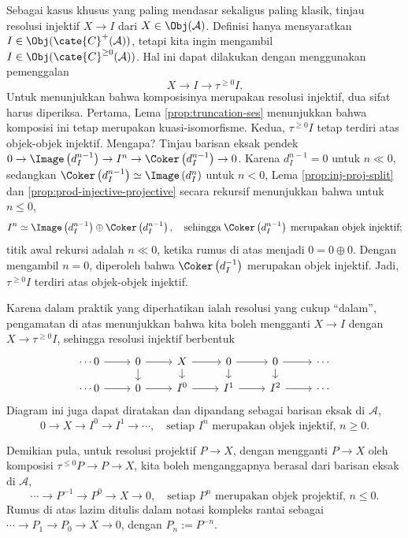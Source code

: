 \begin{contoh}\label{eg:resolution-single}
	Sebagai kasus khusus yang paling mendasar sekaligus paling klasik, tinjau resolusi injektif $X \to I$ dari $X \in \Obj(\mathcal{A})$. Definisi hanya mensyaratkan $I \in \Obj(\cate{C}^+(\mathcal{A}))$, tetapi kita ingin mengambil $I \in \Obj(\cate{C}^{\geq 0}(\mathcal{A}))$. Hal ini dapat dilakukan dengan menggunakan pemenggalan
	\[ X \to I \to \tau^{\geq 0} I . \]
	Untuk menunjukkan bahwa komposisinya merupakan resolusi injektif, dua sifat harus diperiksa. Pertama, Lema \ref{prop:truncation-ses} menunjukkan bahwa komposisi ini tetap merupakan kuasi-isomorfisme. Kedua, $\tau^{\geq 0} I$ tetap terdiri atas objek-objek injektif. Mengapa? Tinjau barisan eksak pendek $0 \to \Image\left(d_I^{n-1} \right) \to I^n \to \Coker\left( d_I^{n-1} \right) \to 0$. Karena $d_I^{n-1} = 0$ untuk $n \ll 0$, sedangkan $\Coker\left( d_I^{n-1} \right) \simeq \Image\left( d_I^n \right)$ untuk $n < 0$, Lema \ref{prop:inj-proj-split} dan \ref{prop:prod-injective-projective} secara rekursif menunjukkan bahwa untuk $n \leq 0$,
	\[ I^n \simeq \Image\left(d_I^{n-1} \right) \oplus \Coker\left( d_I^{n-1} \right) , \quad \text{sehingga}\; \Coker\left(d_I^{n-1} \right) \;\text{merupakan objek injektif}; \]
	titik awal rekursi adalah $n \ll 0$, ketika rumus di atas menjadi $0 = 0 \oplus 0$. Dengan mengambil $n=0$, diperoleh bahwa $\Coker\left( d_I^{-1}\right)$ merupakan objek injektif. Jadi, $\tau^{\geq 0} I$ terdiri atas objek-objek injektif.

	Karena dalam praktik yang diperhatikan ialah resolusi yang cukup ``dalam'', pengamatan di atas menunjukkan bahwa kita boleh mengganti $X \to I$ dengan $X \to \tau^{\geq 0} I$, sehingga resolusi injektif berbentuk
	\[\begin{tikzcd}[row sep=small]
		\cdots 0 \arrow[r] & 0 \arrow[r] \arrow[d] & X \arrow[d] \arrow[r] & 0 \arrow[r] \arrow[d] & 0 \arrow[r] \arrow[d] & \cdots \\
		\cdots 0 \arrow[r] & 0 \arrow[r] & I^0 \arrow[r] & I^1 \arrow[r] & I^2 \arrow[r] & \cdots
	\end{tikzcd}\]
	Diagram ini juga dapat diratakan dan dipandang sebagai barisan eksak di $\mathcal{A}$,
	\[ 0 \to X \to I^0 \to I^1 \to \cdots, \quad \text{setiap $I^n$ merupakan objek injektif, $n \geq 0$}. \]
	
	Demikian pula, untuk resolusi projektif $P \to X$, dengan mengganti $P \to X$ oleh komposisi $\tau^{\leq 0} P \to P \to X$, kita boleh menganggapnya berasal dari barisan eksak di $\mathcal{A}$,
	\[ \cdots \to P^{-1} \to P^0 \to X \to 0, \quad \text{setiap $P^n$ merupakan objek projektif, $n \leq 0$.} \]
	Rumus di atas lazim ditulis dalam notasi kompleks rantai sebagai $\cdots \to P_1 \to P_0 \to X \to 0$, dengan $P_n := P^{-n}$.
\end{contoh}

